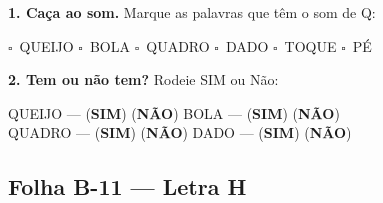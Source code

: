 \begin{somletra}[title={\faMusic~Atividade de Som da Letra --- B\^onus (n\~ao vale nota)}]
\textbf{1. Ca\c{c}a ao som.} Marque as palavras que t\^e{}m o som de Q:
\begin{center}
$\square$~QUEIJO \quad $\square$~BOLA \quad $\square$~QUADRO \quad $\square$~DADO \quad $\square$~TOQUE \quad $\square$~P\'E
\end{center}

\textbf{2. Tem ou n\~ao{} tem?} Rodeie SIM ou N\~ao:
\begin{center}
QUEIJO --- (\textbf{SIM}) (\textbf{N\~AO}) \quad BOLA --- (\textbf{SIM}) (\textbf{N\~AO}) \\ QUADRO --- (\textbf{SIM}) (\textbf{N\~AO}) \quad DADO --- (\textbf{SIM}) (\textbf{N\~AO})
\end{center}
\end{somletra}



\subsection{Folha B-11 --- Letra H}

